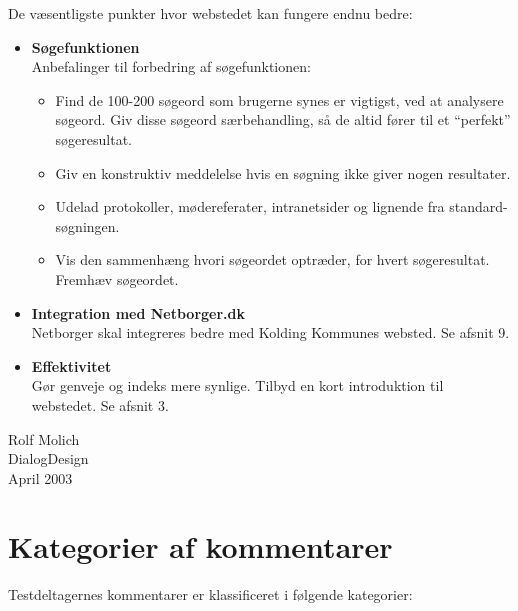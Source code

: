 \documentclass[10pt,a4paper]{article}      %
\begin{document}
De væsentligste punkter hvor webstedet kan fungere endnu bedre:
\begin{itemize}
  \item \textbf{Søgefunktionen}\\
  Anbefalinger til forbedring af søgefunktionen:
  \begin{itemize}
    \item Find de 100-200 søgeord som brugerne synes er vigtigst, ved at analysere søgeord. Giv disse søgeord særbehandling, så de altid fører til et ``perfekt'' søgeresultat.
    \item Giv en konstruktiv meddelelse hvis en søgning ikke giver nogen resultater.
    \item Udelad protokoller, mødereferater, intranetsider og lignende fra standard-søgningen.
    \item Vis den sammenhæng hvori søgeordet optræder, for hvert søgeresultat. Fremhæv søgeordet.
  \end{itemize}
  \item \textbf{Integration med Netborger.dk}\\
  Netborger skal integreres bedre med Kolding Kommunes websted. Se afsnit 9.
  \item \textbf{Effektivitet}\\
  Gør genveje og indeks mere synlige. Tilbyd en kort introduktion til webstedet. Se afsnit 3.
\end{itemize}

\noindent Rolf Molich\\
\noindent DialogDesign\\
\noindent April 2003

\newpage
\tableofcontents
\newpage

\section{Kategorier af kommentarer}
Testdeltagernes kommentarer er klassificeret i følgende kategorier:
\end{document}
